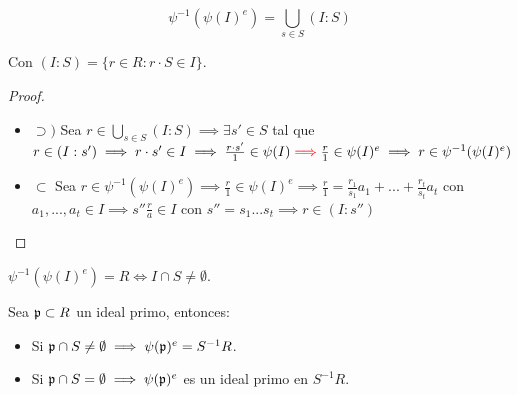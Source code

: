 \begin{prop}
	$$\psi^{-1}(\psi(I)^e)=\bigcup_{s\in S}(I:S)$$

	Con $(I:S)=\{ r \in R: r\cdot S \in I \}$.
\end{prop}

\begin{proof}
	\begin{itemize}
		\item $\supset)$ Sea $r \in \bigcup_{s\in S}(I:S) \implies \exists s' \in S$ tal que $r \in (I:s')\implies r\cdot s' \in I \implies \frac{r \cdot s'}{1} \in \psi(I) \textcolor{red}{\implies} \frac{r}{1} \in \psi(I)^e \implies r \in \psi^{-1}(\psi(I)^e)$
		\item $\subset$ Sea $r \in \psi^{-1}(\psi(I)^e)\implies \frac{r}{1}\in \psi(I)^e \implies \frac{r}{1}=\frac{r_1}{s_1}a_1+...+\frac{r_t}{s_t}a_t$ con $a_1,...,a_t \in I \implies s''\frac{r}{a}\in I$ con $s''=s_1...s_t \implies r \in (I:s'')$
	\end{itemize}
\end{proof}

\begin{prop} $\psi^{-1}(\psi(I)^e)=R \Leftrightarrow I \cap S \neq \emptyset$.
\end{prop}

\begin{prop}
	Sea $\mathfrak{p} \subset R$ un ideal primo, entonces:
	\begin{itemize}
		\item Si $\mathfrak{p} \cap S \neq \emptyset \implies \psi(\mathfrak{p})^e=S^{-1}R$.
		\item Si $\mathfrak{p} \cap S = \emptyset \implies \psi(\mathfrak{p})^e$ es un ideal primo en $S^{-1}R$.
	\end{itemize}
\end{prop}

